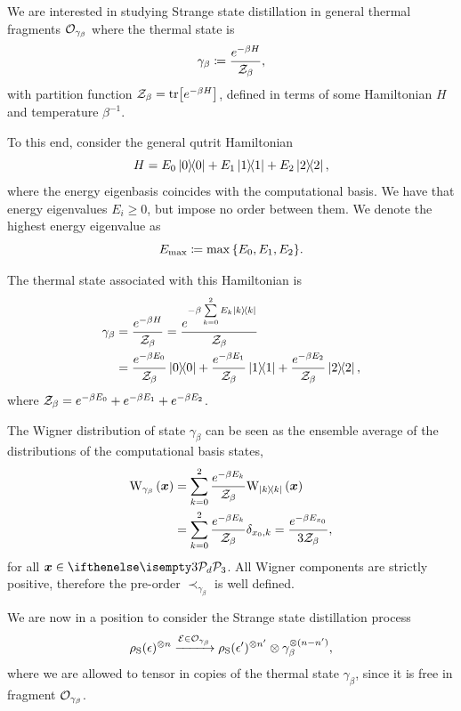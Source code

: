 \documentclass[pra,
aps,
twocolumn,
superscriptaddress,
groupedaddress,
nofootinbib,
reprint
]{revtex4-1}
\begin{document}
We are interested in studying Strange state distillation in general thermal fragments $\mathcal{O}_{\gamma_\beta}$ where the thermal state is
\begin{equation}
	\gamma_\beta \coloneqq \frac{e^{-\beta H}}{\mathcal{Z}_\beta},
\end{equation}
with partition function $\mathcal{Z}_\beta = {\rm{tr}} \big[e^{-\beta H} \big]$, defined in terms of some Hamiltonian $H$ and temperature $\beta^{-1}$.

To this end, consider the general qutrit Hamiltonian
\begin{equation}
	H = E_0 \ketbra{0} + E_1 \ketbra{1} + E_2 \ketbra{2},
\end{equation}
where the energy eigenbasis coincides with the computational basis.
We have that energy eigenvalues $E_i \geq 0$, but impose no order between them.
We denote the highest energy eigenvalue as
\begin{equation}
	E_{\rm{max}} \coloneqq \max{\{E_0, E_1, E_2\}}.
\end{equation}

The thermal state associated with this Hamiltonian is
\begin{align}
	\gamma_\beta &= \frac{e^{-\beta H}}{\mathcal{Z}_\beta} = \frac{e^{-\beta \sum\limits_{k=0}^2 E_k \ketbra{k}}}{\mathcal{Z}_\beta} \\
	&= \frac{e^{-\beta E_0}}{\mathcal{Z}_\beta}\ketbra{0} + \frac{e^{-\beta E_1}}{\mathcal{Z}_\beta}\ketbra{1} + \frac{e^{-\beta E_2}}{\mathcal{Z}_\beta}\ketbra{2},
\end{align}
where $\mathcal{Z}_\beta = e^{-\beta E_0} + e^{-\beta E_1} + e^{-\beta E_2}$.

The Wigner distribution of state $\gamma_\beta$ can be seen as the ensemble average of the distributions of the computational basis states,
\begin{align}
	\W[\bmx]{\gamma_\beta} &= \sum\limits_{k=0}^2 \frac{e^{-\beta E_k}}{\Z_\beta}\W[\bmx]{\ketbra{k}} \\
	&= \sum\limits_{k=0}^2 \frac{e^{-\beta E_k}}{\Z_\beta} \delta_{x_0, k} = \frac{e^{-\beta E_{x_0}}}{3\Z_\beta},
\end{align}
for all $\bmx \in \pd[3]$. 
All Wigner components are strictly positive, therefore the pre-order $\prec_{\gamma_\beta}$ is well defined.

We are now in a position to consider the Strange state distillation process
\begin{equation}\label{eq:msd_thermal}
		\rho_{\rm{S}}(\epsilon)^{\otimes n} \xrightarrow{\mathcal{E} \in \mathcal{O}_{\gamma_\beta}} \rho_{\rm{S}}(\epsilon')^{\otimes n'} \otimes \gamma_\beta^{\otimes (n-n')},
\end{equation}
where we are allowed to tensor in copies of the thermal state $\gamma_\beta$, since it is free in fragment $\mathcal{O}_{\gamma_\beta}$.
\end{document}
